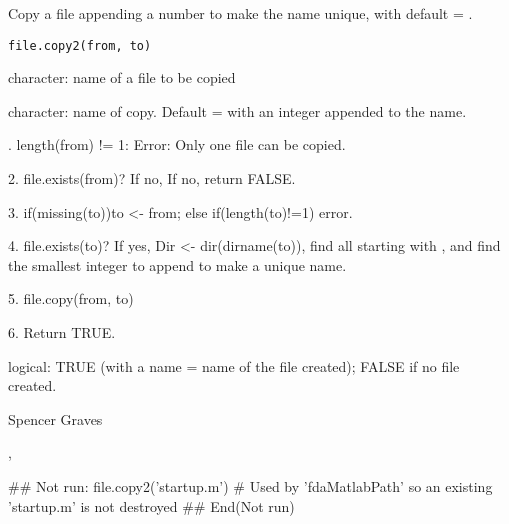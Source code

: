 \begin{Description}\relax
Copy a file appending a number to make the  name unique, with
default  = .
\end{Description}
\begin{Usage}
\begin{verbatim}
file.copy2(from, to) 
\end{verbatim}
\end{Usage}
\begin{Arguments}
\begin{ldescription}
\item[\code{from}] character:  name of a file to be copied 
\item[\code{to}] character:  name of copy.  Default =  with an integer
appended to the name.  

\end{ldescription}
\end{Arguments}
\begin{Details}.  length(from) != 1:  Error:  Only one file can be copied.  

2.  file.exists(from)?  If no, If no, return FALSE.

3.  if(missing(to))to <- from;  else if(length(to)!=1) error.

4.  file.exists(to)?  If yes, Dir <- dir(dirname(to)), find all
 starting with , and find the smallest integer to
append to make a unique  name.  

5.  file.copy(from, to)

6.  Return TRUE.
\end{Details}
\begin{Value}
logical:  TRUE (with a name = name of the file created);  FALSE if no
file created.
\end{Value}
\begin{Author}\relax
Spencer Graves
\end{Author}
\begin{SeeAlso}\relax
{},
\end{SeeAlso}
\begin{Examples}
\begin{ExampleCode}
## Not run: 
file.copy2('startup.m')
# Used by 'fdaMatlabPath' so an existing 'startup.m' is not destroyed
## End(Not run)
\end{ExampleCode}
\end{Examples}


